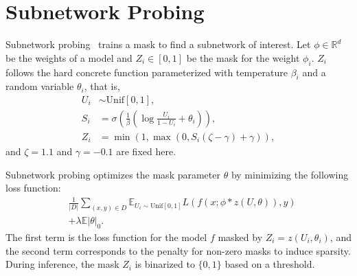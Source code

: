 \section{Subnetwork Probing}
\label{sec:subnetwork-probing}
Subnetwork probing~\citep{cao-etal-2021-low} trains a mask to find a subnetwork of interest.
Let $\phi \in \mathbb{R}^d$ be the weights of a model and $Z_{i}\in [0,1]$ be the mask for the weight $\phi_i$.
$Z_i$ follows the hard concrete function parameterized with temperature $\beta_i$ and a random variable $\theta_i$, that is,
\begin{align*}
U_i &\sim \mathrm{Unif}[0, 1],\\
S_i &= \sigma\left(\frac{1}{\beta}\left(\log\frac{U_i}{1-U_i}+\theta_i\right)\right),\\
Z_i &= \min (1, \max(0, S_i(\zeta-\gamma)+\gamma)),
\end{align*}
and $\zeta=1.1$ and $\gamma=-0.1$ are fixed here.

Subnetwork probing optimizes the mask parameter $\theta$ by minimizing the following loss function:
\begin{align*}
    &\frac{1}{|D|}\sum_{(x, y)\in D}\mathbb{E}_{U_i\sim \mathrm{Unif}[0,1]}L(f(x; \phi * z(U, \theta)), y) \\
    &+ \lambda\mathbb{E}|\theta|_0.
\end{align*}
The first term is the loss function for the model $f$ masked by $Z_i=z(U_i,\theta_i)$, and the second term corresponds to the penalty for non-zero masks to induce sparsity.
During inference, the mask $Z_i$ is binarized to $\{0, 1\}$ based on a threshold.